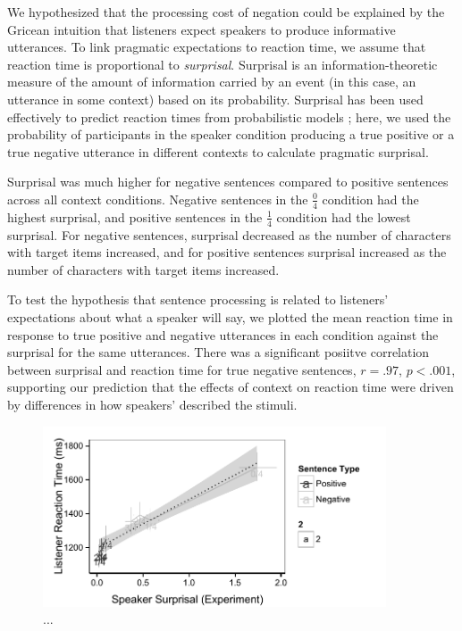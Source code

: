 \documentclass[man, noapacite]{apa2}
\begin{document}
We hypothesized that the processing cost of negation could be explained by the Gricean intuition that listeners expect speakers to produce informative utterances.  To link pragmatic expectations to reaction time, we assume that reaction time is proportional to \emph{surprisal}. Surprisal is an information-theoretic measure of the amount of information carried by an event (in this case, an utterance in some context) based on its probability. Surprisal has been used effectively to predict reaction times from probabilistic models \cite{levy2008}; here, we used the probability of participants in the speaker condition producing a true positive or a true negative utterance in different contexts to calculate pragmatic surprisal.

Surprisal was much higher for negative sentences compared to positive sentences across all context conditions.  Negative sentences in the $\frac{0}{4}$ condition had the highest surprisal, and positive sentences in the $\frac{1}{4}$ condition had the lowest surprisal.  For negative sentences, surprisal decreased as the number of characters with target items increased, and for positive sentences surprisal increased as the number of characters with target items increased.  

To test the hypothesis that sentence processing is related to listeners' expectations about what a speaker will say, we plotted the mean reaction time in response to true positive and negative utterances in each condition against the surprisal for the same utterances.  There was a significant posiitve correlation between surprisal and reaction time for true negative sentences, $r=.97$, $p<.001$, supporting our prediction that the effects of context on reaction time were driven by differences in how speakers' described the stimuli.  


\begin{figure}[t]
\begin{center} 
\includegraphics[width=4in]{figures/production_rts.pdf}
\caption{\label{fig:scatter} ... }
\end{center} 
\end{figure}
\end{document}
